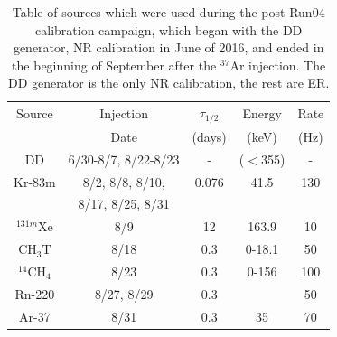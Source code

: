 \begin{table}
\centering
    \begin{tabular}{ c | c | c | c | c }
    \hline
    Source & Injection & $\tau_{1/2}$  & Energy & Rate \\ 
     & Date & (days) & (keV) & (Hz) \\
    \hline \hline
    DD & 6/30-8/7, 8/22-8/23  & - & ($<$355) & - \\ 
    \hline
    Kr-83m & 8/2, 8/8, 8/10,  & 0.076 & 41.5  & 130\\ 
     & 8/17, 8/25, 8/31 & & &\\
    \hline
    $^{131m}$Xe & 8/9 & 12 & 163.9 & 10 \\ 
    \hline
    CH$_3$T & 8/18 & 0.3 & 0-18.1 & 50 \\ 
    \hline
    $^{14}$CH$_4$ & 8/23 & 0.3 & 0-156 & 100 \\ 
    \hline
    Rn-220 & 8/27, 8/29 & 0.3 & & 50 \\ 
    \hline
    Ar-37 & 8/31 & 0.3 & 35 & 70 \\ 
    \hline
    \hline
    \end{tabular}
    \caption{Table of sources which were used during the post-Run04 calibration campaign, which began with the DD generator, NR calibration in June of 2016, and ended in the beginning of September after the $^{37}$Ar injection. The DD generator is the only NR calibration, the rest are ER.}
\end{table}

